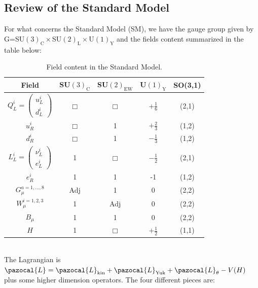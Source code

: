 \documentclass[../main.tex]{subfiles}
\begin{document}
\subsection{Review of the Standard Model}
For what concerns the Standard Model (SM), we have the gauge group given by G=SU$(3)_{\text{C}}\times$SU$(2)_{\text{L}}\times$U$(1)_{\text{Y}}$ and the fields content summarized in the table below:
    \begin{table}[h]
        \centering
        \begin{tabular}{c|c|c|c|c}
        \hline
        \rowcolor{gray!45}Field & SU$(3)_{\text{C}}$ & SU$(2)_{\text{EW}}$ & U$(1)_{\text{Y}}$ & SO(3,1) \\
        \hline
        \cellcolor{orange!45}$Q_L^i=\begin{pmatrix}
             u_L^i\\
             d_L^i 
        \end{pmatrix}$ & \cellcolor{orange!45}$\Box$ & \cellcolor{orange!45}$\Box$ & \cellcolor{orange!45}$+\frac{1}{6}$ &\cellcolor{orange!45} (2,1) \\
        \rowcolor{orange!45}$u_R^i$ & $\Box$ & 1 & $+\frac{2}{3}$ & (1,2) \\
        \rowcolor{orange!45}$d_R^i$ & $\Box$ & 1 & $-\frac{1}{3}$ & (1,2) \\
        \hline
        \cellcolor{orange!45}$L_L^i=\begin{pmatrix}\nu_L^i\\e_L^i\end{pmatrix}$ &\cellcolor{orange!45} 1 &\cellcolor{orange!45} $\Box$ &\cellcolor{orange!45} $-\frac{1}{2}$ &\cellcolor{orange!45} (2,1) \\
        \rowcolor{orange!45}$e_R^i$ & 1 & 1 & -1 & (1,2) \\
        \hline
        \rowcolor{blue!35}$G_\mu^{a=1,\dots,8}$ & Adj & 1 & 0 & (2,2)\\
        \rowcolor{blue!35}$W_\mu^{i=1,2,3}$ & 1 & Adj & 0 & (2,2)\\
        \rowcolor{blue!35}$B_\mu$ & 1 & 1 & 0 & (2,2)\\
        \hline
        \rowcolor{purple!45}$H$ & 1 & $\Box$ & $+\frac{1}{2}$ & (1,1)\\
        \hline
        \end{tabular}
        \caption{Field content in the Standard Model.}
    \end{table}\\
The Lagrangian is $\pazocal{L}=\pazocal{L}_{\text{kin}}+\pazocal{L}_{\text{Yuk}}+\pazocal{L}_\theta-V(H)$ plus some higher dimension operators. The four different pieces are:
\end{document}
